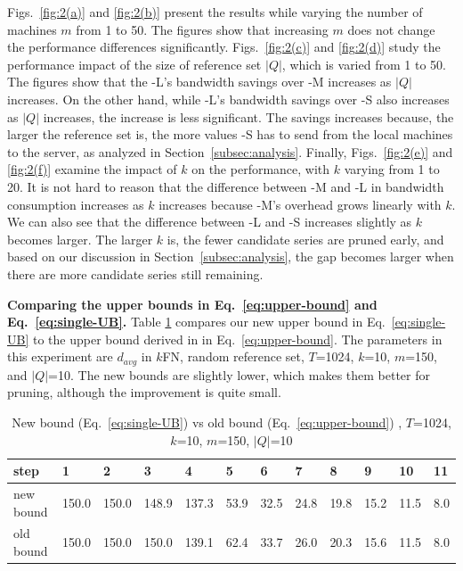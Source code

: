 Figs.~\ref{fig:2(a)} and \ref{fig:2(b)} present the results while
varying the number of machines $m$ from 1 to 50. The figures show that
increasing $m$ does not change the performance differences
significantly.  Figs.~\ref{fig:2(c)} and \ref{fig:2(d)} study the
performance impact of the size of reference set $|Q|$, which is varied 
from 1 to 50.  The figures show that the \MSWave-L{}'s bandwidth
savings over \LeeWave-M{} increases as $|Q|$ increases. On
the other hand, while \MSWave-L{}'s bandwidth savings over \MSWave-S{}
also increases as $|Q|$ increases, the increase is less significant.
The savings increases because, the larger the reference
set is, the more values \MSWave-S{} has to send from the local machines to
the server, as analyzed in Section~\ref{subsec:analysis}. Finally,
Figs.~\ref{fig:2(e)} and \ref{fig:2(f)} examine the impact of $k$ on 
the performance, with $k$ varying from 1 to 20.
It is not hard to reason that the difference
between \LeeWave-M{} and \MSWave-L{} in bandwidth consumption
increases as $k$ increases because \LeeWave-M{}'s overhead grows linearly with
$k$. We can also see that the difference between \MSWave-L{} and
\MSWave-S{} increases slightly as $k$ becomes larger. The larger $k$ is,
the fewer candidate series are pruned early, and based on our discussion in
Section~\ref{subsec:analysis}, the gap becomes larger when there are more 
candidate series still remaining.

\textbf{Comparing the upper bounds in Eq.~\eqref{eq:upper-bound} and
Eq.~\eqref{eq:single-UB}.} Table \ref{tbl:bound} compares our new upper
bound in Eq.~\eqref{eq:single-UB} to the upper bound derived in \LeeWave{} 
in Eq.~\eqref{eq:upper-bound}. The
parameters in this experiment are $d_{avg}$ in $k$FN, random reference
set, $T$=1024, $k$=10, $m$=150, and $|Q|$=10. The new bounds
are slightly lower, which makes them better for pruning, although
the improvement is quite small.

\begin{table}[tb]
\centering
\caption{New bound (Eq.~\eqref{eq:single-UB}) vs old bound (Eq.~\eqref{eq:upper-bound}) , $T$=1024, $k$=10, $m$=150, $|Q|$=10}
\label{tbl:bound}
\vspace*{0.05in}
\begin{tabular}{|l|l|l|l|l|l|l|l|l|l|l|l|}
\hline
step & 1 & 2 & 3 & 4 & 5 & 6 & 7 & 8 & 9 & 10 & 11 \\ \hline
new bound & 150.0 & 150.0 & 148.9 & 137.3 & 53.9 & 32.5 & 24.8 & 19.8 & 15.2 & 11.5 & 8.0 \\ \hline
old bound & 150.0 & 150.0 & 150.0 & 139.1 & 62.4 & 33.7 & 26.0 & 20.3 & 15.6 & 11.5 & 8.0 \\ \hline
\end{tabular}
\vspace{0.1in}
\end{table}

